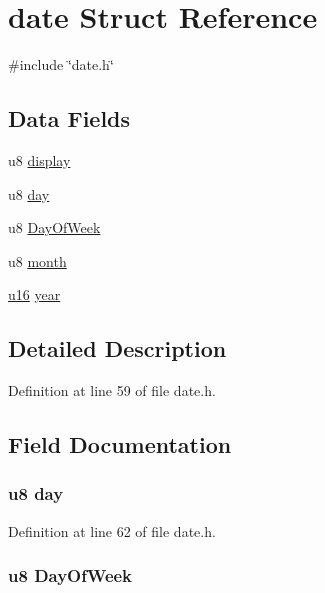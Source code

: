 \hypertarget{structdate}{\section{date \-Struct \-Reference}
\label{structdate}
}


{\ttfamily \#include \char`\"{}date.\-h\char`\"{}}

\subsection*{\-Data \-Fields}
\begin{DoxyCompactItemize}
\item 
u8 \hyperlink{structdate_a38f8f410104c7551db27a14196c8e15c}{display}
\item 
u8 \hyperlink{structdate_a00744abff86163a4cf7dbef9b647902e}{day}
\item 
u8 \hyperlink{structdate_a92d16cf35d526c1a98da9f767ed8997c}{\-Day\-Of\-Week}
\item 
u8 \hyperlink{structdate_ad5f8cd6773aef677b920ae4e4265bb10}{month}
\item 
\hyperlink{main__ED__BM_8c_a9e6c91d77e24643b888dbd1a1a590054}{u16} \hyperlink{structdate_a5f976764bc633de731704ebdaf334b0b}{year}
\end{DoxyCompactItemize}


\subsection{\-Detailed \-Description}


\-Definition at line 59 of file date.\-h.



\subsection{\-Field \-Documentation}
\hypertarget{structdate_a00744abff86163a4cf7dbef9b647902e}{
\subsubsection[{day}]{\setlength{\rightskip}{0pt plus 5cm}u8 {\bf day}}}\label{structdate_a00744abff86163a4cf7dbef9b647902e}


\-Definition at line 62 of file date.\-h.

\hypertarget{structdate_a92d16cf35d526c1a98da9f767ed8997c}{
\subsubsection[{\-Day\-Of\-Week}]{\setlength{\rightskip}{0pt plus 5cm}u8 {\bf \-Day\-Of\-Week}}}\label{structdate_a92d16cf35d526c1a98da9f767ed8997c}


